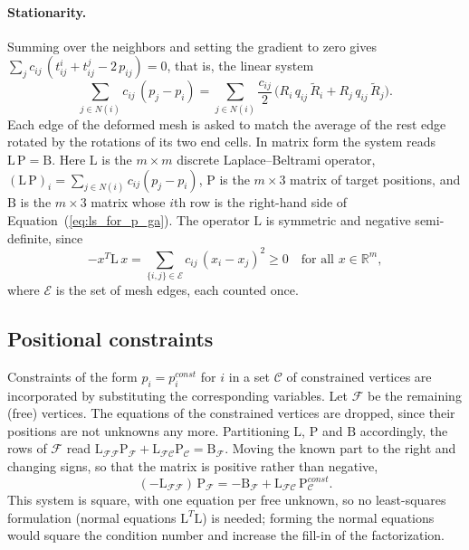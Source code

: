 \documentclass{birkjour}
\theoremstyle{remark}
\numberwithin{equation}{section}
\begin{document}
\paragraph{Stationarity.} Summing over the neighbors and setting the gradient to zero gives $\sum_{j} c_{ij} \, ( t^i_{ij} + t^j_{ij} - 2 \, p_{ij} ) = 0$, that is, the linear system \cite{Lopez2013}
\begin{equation}
\label{eq:ls_for_p_ga}
\sum_{j \in N(i)} c_{ij} \, (p_j - p_i) = \sum_{j \in N(i)} \frac{c_{ij}}{2} \, \big( R_i \, q_{ij} \, \tilde R_i + R_j \, q_{ij} \, \tilde R_j \big).
\end{equation}
Each edge of the deformed mesh is asked to match the average of the rest edge rotated by the rotations of its two end cells. In matrix form the system reads $\mathrm L \, \mathrm P = \mathrm B$. Here $\mathrm L$ is the $m \times m$ discrete Laplace--Beltrami operator, $(\mathrm L \, \mathrm P)_i = \sum_{j \in N(i)} c_{ij} (p_j - p_i)$, $\mathrm P$ is the $m \times 3$ matrix of target positions, and $\mathrm B$ is the $m \times 3$ matrix whose $i$th row is the right-hand side of Equation~(\ref{eq:ls_for_p_ga}). The operator $\mathrm L$ is symmetric and negative semi-definite, since
\begin{equation*}
-x^T \mathrm L \, x = \sum_{\{i,j\} \in \mathcal E} c_{ij} \, (x_i - x_j)^2 \geq 0 \quad \text{for all } x \in \mathbb R^m,
\end{equation*}
where $\mathcal E$ is the set of mesh edges, each counted once.

\subsection{Positional constraints}
Constraints of the form $p_i = p^{const}_i$ for $i$ in a set $\mathcal C$ of constrained vertices are incorporated by substituting the corresponding variables. Let $\mathcal F$ be the remaining (free) vertices. The equations of the constrained vertices are dropped, since their positions are not unknowns any more. Partitioning $\mathrm L$, $\mathrm P$ and $\mathrm B$ accordingly, the rows of $\mathcal F$ read $\mathrm L_{\mathcal F \mathcal F} \mathrm P_{\mathcal F} + \mathrm L_{\mathcal F \mathcal C} \mathrm P_{\mathcal C} = \mathrm B_{\mathcal F}$. Moving the known part to the right and changing signs, so that the matrix is positive rather than negative,
\begin{equation}
\label{eq:global_reduced}
(-\mathrm L_{\mathcal F \mathcal F}) \, \mathrm P_{\mathcal F} = -\mathrm B_{\mathcal F} + \mathrm L_{\mathcal F \mathcal C} \, \mathrm P^{const}_{\mathcal C}.
\end{equation}
This system is square, with one equation per free unknown, so no least-squares formulation (normal equations $\mathrm L^T \mathrm L$) is needed; forming the normal equations would square the condition number and increase the fill-in of the factorization.
\end{document}

